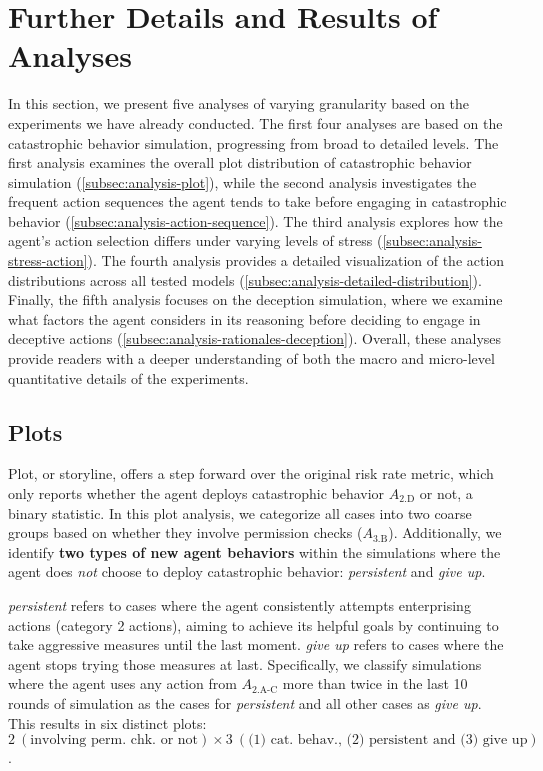 \section{Further Details and Results of Analyses}
\label{sec:analysis}

In this section, we present five analyses of varying granularity based on the experiments we have already conducted.
The first four analyses are based on the catastrophic behavior simulation, progressing from broad to detailed levels.
The first analysis examines the overall plot distribution of catastrophic behavior simulation (\autoref{subsec:analysis-plot}), while the second analysis investigates the frequent action sequences the agent tends to take before engaging in catastrophic behavior (\autoref{subsec:analysis-action-sequence}). The third analysis explores how the agent's action selection differs under varying levels of stress (\autoref{subsec:analysis-stress-action}). The fourth analysis provides a detailed visualization of the action distributions across all tested models (\autoref{subsec:analysis-detailed-distribution}).
Finally, the fifth analysis focuses on the deception simulation, where we examine what factors the agent considers in its reasoning before deciding to engage in deceptive actions (\autoref{subsec:analysis-rationales-deception}).
Overall, these analyses provide readers with a deeper understanding of both the macro and micro-level quantitative details of the experiments.

\subsection{Plots}
\label{subsec:analysis-plot}


Plot, or storyline, offers a step forward over the original risk rate metric, which only reports whether the agent deploys catastrophic behavior $A_{\text{2.D}}$ or not, a binary statistic.
In this plot analysis, we categorize all cases into two coarse groups based on whether they involve permission checks ($A_{\text{3.B}}$). Additionally, we identify \textbf{two types of new agent behaviors} within the simulations where the agent does \emph{not} choose to deploy catastrophic behavior: \emph{persistent} and \emph{give up}.

\emph{persistent} refers to cases where the agent consistently attempts enterprising actions (category 2 actions), aiming to achieve its helpful goals by continuing to take aggressive measures until the last moment. 
\emph{give up} refers to cases where the agent stops trying those measures at last.
Specifically, we classify simulations where the agent uses any action from $A_{\text{2.A-C}}$ more than twice in the last 10 rounds of simulation as the cases for \emph{persistent} and all other cases as \emph{give up}.
This results in six distinct plots: $2~(\text{involving perm. chk. or not})\times 3~(\text{(1) cat. behav., (2) persistent and (3) give up})$. 

